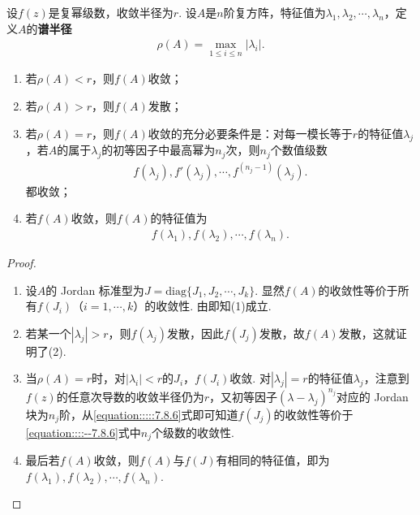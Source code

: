 \documentclass[../../main.tex]{subfiles}
\begin{document}
\begin{theorem}\label{theorem:复方阵幂级数的谱半径}
设\(f(z)\)是复幂级数，收敛半径为\(r\). 设\(A\)是\(n\)阶复方阵，特征值为\(\lambda_1,\lambda_2,\cdots,\lambda_n\)，定义\(A\)的\textbf{谱半径}
\begin{align*}
\rho(A) = \max_{1 \leq i \leq n}|\lambda_i|.
\end{align*}
\begin{enumerate}[(1)]
\item 若\(\rho(A) < r\)，则\(f(A)\)收敛；

\item 若\(\rho(A) > r\)，则\(f(A)\)发散；

\item 若\(\rho(A) = r\)，则\(f(A)\)收敛的充分必要条件是：对每一模长等于\(r\)的特征值\(\lambda_j\)，若\(A\)的属于\(\lambda_j\)的初等因子中最高幂为\(n_j\)次，则\(n_j\)个数值级数
\begin{align}
f(\lambda_j), f'(\lambda_j), \cdots, f^{(n_j - 1)}(\lambda_j) .\label{equation::::--7.8.6}
\end{align}
都收敛；

\item 若\(f(A)\)收敛，则\(f(A)\)的特征值为
\begin{align*}
f(\lambda_1), f(\lambda_2), \cdots, f(\lambda_n).
\end{align*} 
\end{enumerate}
\end{theorem}
\begin{proof}
\begin{enumerate}[(1)]
\item 设\(A\)的 Jordan 标准型为\(J = \mathrm{diag}\{J_1,J_2,\cdots,J_k\}\). 显然\(f(A)\)的收敛性等价于所有\(f(J_i)\)（\(i = 1,\cdots,k\)）的收敛性. 由即知(1)成立.

\item 若某一个\(|\lambda_j| > r\)，则\(f(\lambda_j)\)发散，因此\(f(J_j)\)发散，故\(f(A)\)发散，这就证明了(2).

\item 当\(\rho(A) = r\)时，对\(|\lambda_i| < r\)的\(J_i\)，\(f(J_i)\)收敛. 对\(|\lambda_j| = r\)的特征值\(\lambda_j\)，注意到\(f(z)\)的任意次导数的收敛半径仍为\(r\)，又初等因子\((\lambda - \lambda_j)^{n_j}\)对应的 Jordan 块为\(n_j\)阶，从\eqref{equation:::::7.8.6}式即可知道\(f(J_j)\)的收敛性等价于\eqref{equation::::--7.8.6}式中\(n_j\)个级数的收敛性.

\item 最后若\(f(A)\)收敛，则\(f(A)\)与\(f(J)\)有相同的特征值，即为\(f(\lambda_1),f(\lambda_2),\cdots,f(\lambda_n)\).
\end{enumerate}
\end{proof}
\end{document}
